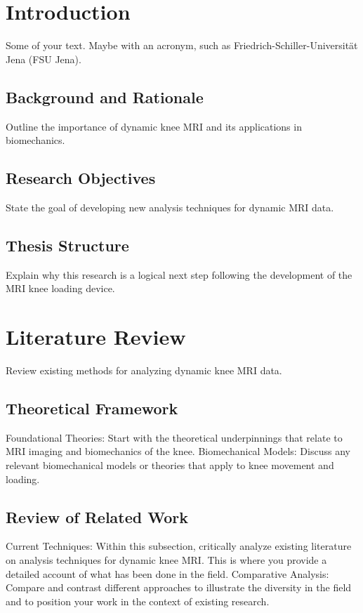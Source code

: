 \documentclass{micro-econ-thesis}
\begin{document}

\cleardoublepage
\pagestyle{headings}
\setcounter{page}{1}
\onehalfspacing %


\section{Introduction}
\label{sec:intro}

Some of your text. Maybe with an acronym, such as Friedrich-Schiller-Universität Jena (FSU Jena).

\subsection{Background and Rationale}
Outline the importance of dynamic knee MRI and its applications in biomechanics. 
\subsection{Research Objectives}
State the goal of developing new analysis techniques for dynamic MRI data.
\subsection{Thesis Structure}
Explain why this research is a logical next step following the development of the MRI knee loading device. 
\section{Literature Review}
\label{sec:first}
Review existing methods for analyzing dynamic knee MRI data.

\subsection{Theoretical Framework}
Foundational Theories: Start with the theoretical underpinnings that relate to MRI imaging and biomechanics of the knee.
Biomechanical Models: Discuss any relevant biomechanical models or theories that apply to knee movement and loading. 
\label{subsec:first}


\subsection{Review of Related Work}
Current Techniques: Within this subsection, critically analyze existing literature on analysis techniques for dynamic knee MRI. This is where you provide a detailed account of what has been done in the field. \parencite{Lund1992}
Comparative Analysis: Compare and contrast different approaches to illustrate the diversity in the field and to position your work in the context of existing research.
\label{subsec:second}
\end{document}
